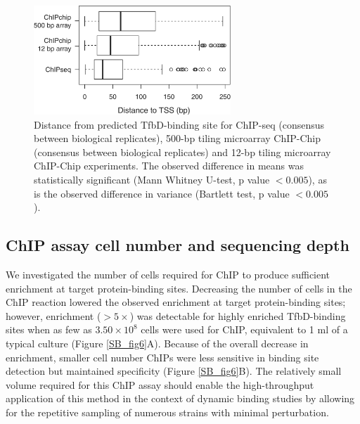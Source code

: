 \begin{figure}
\centering
\includegraphics[width=20em]{SaltyBugs/figures/fig5}
\caption{Distance from predicted TfbD-binding site for ChIP-seq (consensus between biological replicates), 500-bp tiling microarray ChIP-Chip (consensus between biological replicates) and 12-bp tiling microarray ChIP-Chip experiments. The observed difference in means was statistically significant (Mann Whitney U-test, p value $<0.005$), as is the observed difference in variance (Bartlett test, p value $<0.005$).}
\label{SB_fig5}
\end{figure}

\subsection{ChIP assay cell number and sequencing depth}

We investigated the number of cells required for ChIP to produce sufficient enrichment at target protein-binding sites. Decreasing the number of cells in the ChIP reaction lowered the observed enrichment at target protein-binding sites; however, enrichment ($>5\times$) was detectable for highly enriched TfbD-binding sites when as few as $3.50 \times 10^8$ cells were used for ChIP, equivalent to 1 ml of a typical culture (Figure \ref{SB_fig6}A). Because of the overall decrease in enrichment, smaller cell number ChIPs were less sensitive in binding site detection but maintained specificity (Figure \ref{SB_fig6}B). The relatively small volume required for this ChIP assay should enable the high-throughput application of this method in the context of dynamic binding studies by allowing for the repetitive sampling of numerous strains with minimal perturbation.

